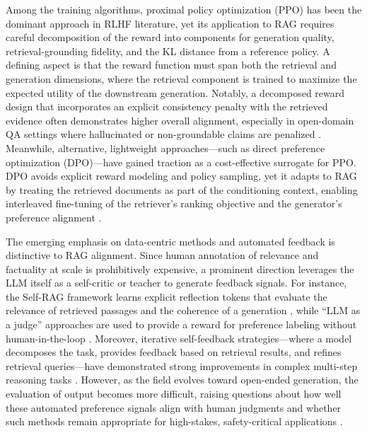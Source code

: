 \documentclass[11pt,a4paper]{article}
\begin{document}
Among the training algorithms, proximal policy optimization (PPO) has been the dominant approach in RLHF literature, yet its application to RAG requires careful decomposition of the reward into components for generation quality, retrieval-grounding fidelity, and the KL distance from a reference policy. A defining aspect is that the reward function must span both the retrieval and generation dimensions, where the retrieval component is trained to maximize the expected utility of the downstream generation. Notably, a decomposed reward design that incorporates an explicit consistency penalty with the retrieved evidence often demonstrates higher overall alignment, especially in open-domain QA settings where hallucinated or non-groundable claims are penalized \cite{arxiv:2407.16216v1,arxiv:2310.11511v1}. Meanwhile, alternative, lightweight approaches---such as direct preference optimization (DPO)---have gained traction as a cost-effective surrogate for PPO. DPO avoids explicit reward modeling and policy sampling, yet it adapts to RAG by treating the retrieved documents as part of the conditioning context, enabling interleaved fine-tuning of the retriever's ranking objective and the generator's preference alignment \cite{arxiv:2312.05934v3}.

The emerging emphasis on data-centric methods and automated feedback is distinctive to RAG alignment. Since human annotation of relevance and factuality at scale is prohibitively expensive, a prominent direction leverages the LLM itself as a self-critic or teacher to generate feedback signals. For instance, the Self-RAG framework learns explicit reflection tokens that evaluate the relevance of retrieved passages and the coherence of a generation \cite{arxiv:2310.11511v1}, while ``LLM as a judge'' approaches are used to provide a reward for preference labeling without human-in-the-loop \cite{arxiv:2401.01313v3}. Moreover, iterative self-feedback strategies---where a model decomposes the task, provides feedback based on retrieval results, and refines retrieval queries---have demonstrated strong improvements in complex multi-step reasoning tasks \cite{arxiv:2403.06840v1}. However, as the field evolves toward open-ended generation, the evaluation of output becomes more difficult, raising questions about how well these automated preference signals align with human judgments and whether such methods remain appropriate for high-stakes, safety-critical applications \cite{arxiv:2305.11206v1}.
\end{document}
